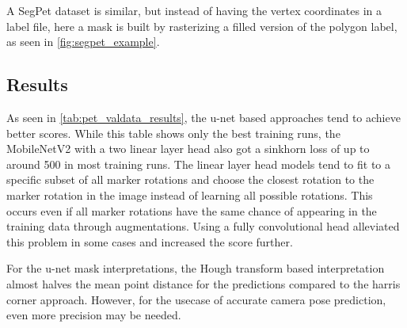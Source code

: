 \documentclass[10pt]{book}
\newcommand{\figureref}[1]{\autoref{#1}}
\begin{document}
A SegPet dataset is similar, but instead of having the vertex coordinates in a label file, here a mask is built by rasterizing a filled version of the polygon label, as seen in \figureref{fig:segpet_example}.

\subsection{Results}

As seen in \autoref{tab:pet_valdata_results}, the u-net based approaches tend to achieve better scores. While this table shows only the best training runs, the MobileNetV2 with a two linear layer head also got a sinkhorn loss of up to around 500 in most training runs. %
The linear layer head models tend to fit to a specific subset of all marker rotations and choose the closest rotation to the marker rotation in the image instead of learning all possible rotations. This occurs even if all marker rotations have the same chance of appearing in the training data through augmentations. Using a fully convolutional head alleviated this problem in some cases and increased the score further.

For the u-net mask interpretations, the Hough transform based interpretation almost halves the mean point distance for the predictions compared to the harris corner approach. However, for the usecase of accurate camera pose prediction, even more precision may be needed.
\end{document}
